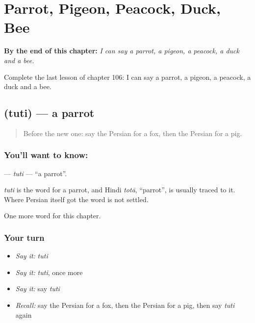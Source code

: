
\chapter{Parrot, Pigeon, Peacock, Duck, Bee}
\label{ch:fa-parrot-pigeon-peacock-duck-bee}

\begin{chapteropening}
\textbf{By the end of this chapter:} \emph{I can say a parrot, a pigeon, a peacock, a duck and a bee.}

Complete the last lesson of chapter 106: I can say a parrot, a pigeon, a peacock, a duck and a bee.
\end{chapteropening}

\section[\texorpdfstring{\fa{طوطی} (tuti)}{طوطی (tuti)}]{ (tuti) — a parrot}

\label{lesson:FA-C106-tuti}



\begin{quote}
Before the new one: say the Persian for a fox, then the Persian for a pig.
\end{quote}

\subsection*{You'll want to know: }
\textbf{} — \emph{tuti} — \textquotedblleft{}a parrot\textquotedblright{}.

\begin{cousinweb}
\emph{tuti} is the word for a parrot, and Hindi \emph{totā}, \textquotedblleft{}parrot\textquotedblright{}, is usually traced to it. Where Persian itself got the word is not settled.
\end{cousinweb}

\begin{grammarlens}[title={What you've built}]
One more word for this chapter.
\end{grammarlens}

\subsection*{Your turn}
\begin{itemize}
\raggedright
  \item \emph{Say it:} \emph{tuti}
  \item \emph{Say it:} \emph{tuti}, once more
  \item \emph{Say it:} say \emph{tuti}
  \item \emph{Recall:} say the Persian for a fox, then the Persian for a pig, then say \emph{tuti} again
\end{itemize}


